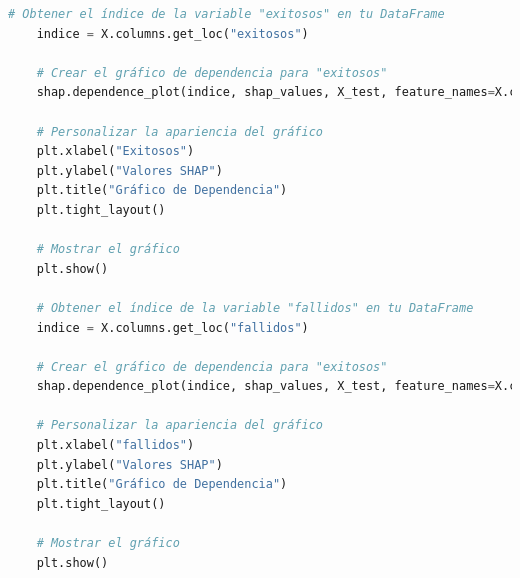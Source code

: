 \begin{lstlisting}[language=Python, caption=Grafico de dependencia exitosos  fallidos, label=lst:grafDepExitososFallidos]
    # Obtener el índice de la variable "exitosos" en tu DataFrame
    indice = X.columns.get_loc("exitosos")
    
    # Crear el gráfico de dependencia para "exitosos"
    shap.dependence_plot(indice, shap_values, X_test, feature_names=X.columns, show=False)
    
    # Personalizar la apariencia del gráfico
    plt.xlabel("Exitosos")
    plt.ylabel("Valores SHAP")
    plt.title("Gráfico de Dependencia")
    plt.tight_layout()
    
    # Mostrar el gráfico
    plt.show()

    # Obtener el índice de la variable "fallidos" en tu DataFrame
    indice = X.columns.get_loc("fallidos")
    
    # Crear el gráfico de dependencia para "exitosos"
    shap.dependence_plot(indice, shap_values, X_test, feature_names=X.columns, show=False)
    
    # Personalizar la apariencia del gráfico
    plt.xlabel("fallidos")
    plt.ylabel("Valores SHAP")
    plt.title("Gráfico de Dependencia")
    plt.tight_layout()
    
    # Mostrar el gráfico
    plt.show()
\end{lstlisting}

